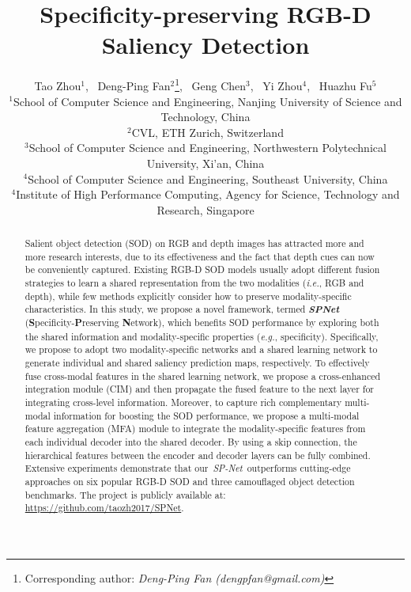 \documentclass[10pt,twocolumn,letterpaper]{article}
\def\ie{\emph{i.e.}}
\def\eg{\emph{e.g.}}
\def\ours{\emph{SP-Net}}
\begin{document}
\title{Specificity-preserving RGB-D Saliency Detection}



\author{Tao Zhou$^{1}$, ~Deng-Ping Fan$^{2}$\thanks{Corresponding author: \emph{Deng-Ping Fan (dengpfan@gmail.com)}}, ~Geng Chen$^{3}$, ~Yi Zhou$^4$, ~Huazhu Fu$^5$\\ 	
	   \normalsize{$^1$School of Computer Science and Engineering, Nanjing University of Science and Technology, China}\\
	   \normalsize{$^2$CVL, ETH Zurich, Switzerland}\\
	   \normalsize{$^3$School of Computer Science and Engineering, Northwestern Polytechnical University, Xi'an, China} \\
	   \normalsize{$^4$School of Computer Science and Engineering, Southeast University, China}\\
	   \normalsize{$^4$Institute of High Performance Computing, Agency for Science, Technology and Research, Singapore}\\
}




\maketitle
\ificcvfinal\thispagestyle{empty}\fi

\begin{abstract}

Salient object detection (SOD) on RGB and depth images has attracted more and more research interests, due to its effectiveness and the fact that depth cues can now be conveniently captured. Existing RGB-D SOD models usually adopt different fusion strategies to learn a shared representation from the two modalities (\ie, RGB and depth), while few methods explicitly consider how to preserve modality-specific characteristics. In this study, we propose a novel framework, termed \emph{\textbf{SPNet}} (\textbf{S}pecificity-\textbf{P}reserving \textbf{N}etwork), which benefits SOD performance by exploring both the shared information and modality-specific properties (\eg, specificity). Specifically, we propose to adopt two modality-specific networks and a shared learning network to generate individual and shared saliency prediction maps, respectively. To effectively fuse cross-modal features in the shared learning network, we propose a cross-enhanced integration module (CIM) and then propagate the fused feature to the next layer for integrating cross-level information. Moreover, to capture rich complementary multi-modal information for boosting the SOD performance, we propose a multi-modal feature aggregation (MFA) module to integrate the modality-specific features from each individual decoder into the shared decoder. By using a skip connection, the hierarchical features between the encoder and decoder layers can be fully combined. Extensive experiments demonstrate that our~\ours~outperforms cutting-edge approaches on six popular RGB-D SOD and three camouflaged object detection benchmarks. The project is publicly available at: \url{https://github.com/taozh2017/SPNet}. 

\end{abstract}
\end{document}
